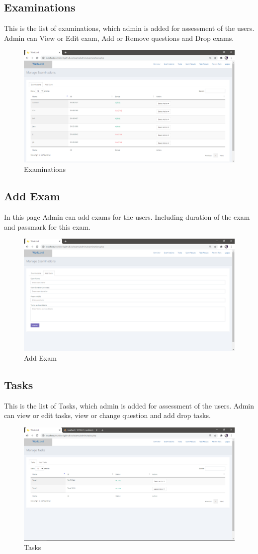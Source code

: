 \documentclass[a4paper,12pt]{report}
\begin{document}
\pagebreak

\subsection {Examinations}
This is the list of examinations, which admin is added for assessment of the users. Admin can View or Edit exam, Add or Remove questions and Drop exams.
\begin{figure}[bph]
	\centering
	\includegraphics[width=.7\linewidth ]{img/screenshots/admin/examslist}
	\caption{Examinations}
\end{figure}

\subsection {Add Exam}
In this page Admin can add exams for the users. Including duration of the exam and passmark for this exam.
\begin{figure}[bph]
	\centering
	\includegraphics[width=.7\linewidth ]{img/screenshots/admin/addexams}
	\caption{Add Exam}
\end{figure}

\pagebreak

\subsection {Tasks}
This is the list of Tasks, which admin is added for assessment of the users. Admin can view or edit tasks, view or change question and add drop tasks.
\begin{figure}[bph]
	\centering
	\includegraphics[width=.7\linewidth ]{img/screenshots/admin/tasks_list}
	\caption{Tasks}
\end{figure}
\end{document}
